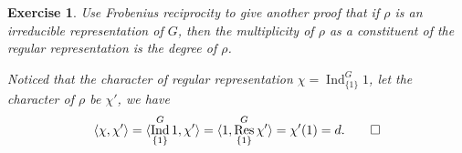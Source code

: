 \documentclass[11pt]{report}
\theoremstyle{mythm}
\let\oldendproof\endproof
\renewenvironment{proof}[1][\proofname]{%
  \oldproof[\normalfont \bfseries #1]%
}{\oldendproof}
\newtheorem{exercise}{Exercise}[chapter]
\renewcommand*{\proofname}{Proof}
\theoremstyle{myans}
\DeclareMathOperator{\Ind}{Ind}
\DeclareMathOperator{\Res}{Res}
\newcommand{\ang}[1]{\langle #1 \rangle}
\begin{document}
\begin{exercise}
  Use Frobenius reciprocity to give another proof that if $\rho$ is an irreducible representation
  of $G$, then the multiplicity of $\rho$ as a constituent of the regular representation is the
  degree of $\rho$.
  \begin{proof}
    Noticed that the character of regular representation $\chi = \Ind_{\{1\}}^{G} 1$,
    let the character of $\rho$ be $\chi'$, we have
    \[ \ang{\chi, \chi'} = \ang{\Ind_{\{1\}}^G 1, \chi'}
    = \ang{1, \Res_{\{1\}}^G \chi'}
    = \chi'(1) = d. \qedhere \]
  \end{proof}
\end{exercise}
\end{document}
